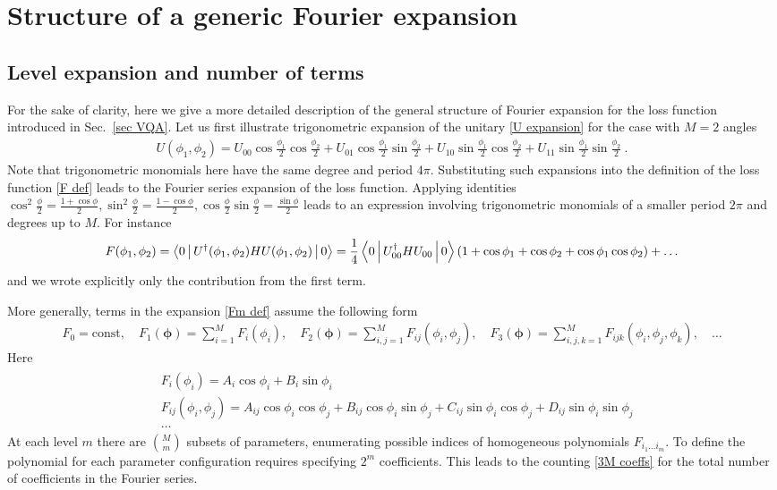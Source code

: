 \documentclass[twocolumn, amsfonts, amssymb, aps, nofootinbib]{revtex4-2}
\begin{document}
\onecolumngrid


\appendix
\section{Structure of a generic Fourier expansion} \label{app explicit}
\subsection{Level expansion and number of terms}
For the sake of clarity, here we give a more detailed description of the general structure of Fourier expansion for the loss function introduced in Sec.~\ref{sec VQA}. Let us first illustrate trigonometric expansion of the unitary \eqref{U expansion} for the case with $M=2$ angles
\begin{align}
	U(\phi_1,\phi_2) = U_{00}\cos\frac{\phi_1}{2}\cos\frac{\phi_2}{2}+U_{01}\cos\frac{\phi_1}{2}\sin\frac{\phi_2}{2}+U_{10}\sin\frac{\phi_1}{2}\cos\frac{\phi_2}{2}+U_{11}\sin\frac{\phi_1}{2}\sin\frac{\phi_2}{2} \ . \label{U2}
\end{align}
Note that trigonometric monomials here have the same degree and period $4\pi$. Substituting such expansions into the definition of the loss function \eqref{F def} leads to the Fourier series expansion of the loss function. Applying identities $\cos^2\frac{\phi}{2}=\frac{1+\cos\phi}{2}, \sin^2\frac{\phi}{2}=\frac{1-\cos\phi}{2}, \cos\frac{\phi}{2}\sin\frac{\phi}{2}=\frac{\sin\phi}{2}$ leads to an expression involving trigonometric monomials of a smaller period $2\pi$ and degrees up to $M$. For instance 
\begin{align}
	F(\phi_1,\phi_2)=\Braket{0|U^\dagger(\phi_1,\phi_2)HU(\phi_1,\phi_2)|0}=\frac14\Braket{0|U_{00}^\dagger HU_{00}|0}\left(1+\cos\phi_1+\cos\phi_2+\cos\phi_1\cos\phi_2\right)+\dots
\end{align}
and we wrote explicitly only the contribution from the first term.

More generally, terms in the expansion \eqref{Fm def} assume the following form
\begin{align}
F_0=\text{const},\quad
F_1(\pmb\phi)=\sum_{i=1}^M F_i(\phi_i), \quad F_2(\pmb\phi)=\sum_{i,j=1}^M F_{ij}(\phi_i,\phi_j), \quad F_3(\pmb\phi)=\sum_{i,j,k=1}^M F_{ijk}(\phi_i,\phi_j,\phi_k),\quad\dots
\end{align}
Here
\begin{align}
\begin{split}
&F_i(\phi_i)=A_i\cos\phi_i+B_i\sin\phi_i\\
&F_{ij}(\phi_i,\phi_j)=A_{ij}\cos\phi_i\cos\phi_j+B_{ij}\cos\phi_i\sin\phi_j+C_{ij}\sin\phi_i\cos\phi_j+D_{ij}\sin\phi_i\sin\phi_j\\
&\dots
\end{split}
\end{align}
At each level $m$ there are $\binom{M}{m}$ subsets of parameters, enumerating possible indices of homogeneous polynomials $F_{i_1\dots i_m}$. To define the polynomial for each parameter configuration requires specifying $2^m$ coefficients. This leads to the counting \eqref{3M coeffs} for the total number of coefficients in the Fourier series.
\end{document}
